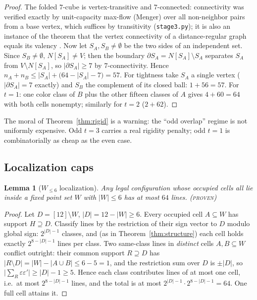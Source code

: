 \documentclass[11pt]{article}
\newtheorem{lemma}[theorem]{Lemma}
\theoremstyle{remark}
\begin{document}
\begin{proof}
The folded $7$-cube is vertex-transitive and $7$-connected: connectivity
was verified exactly by unit-capacity max-flow (Menger) over all
non-neighbor pairs from a base vertex, which suffices by transitivity
(\texttt{stage3.py}); it is also an instance of the theorem that the
vertex connectivity of a distance-regular graph equals its valency
\cite{BrouwerKoolen09}. Now let $S_A,S_B\ne\emptyset$ be the two sides of
an independent set. Since $S_B\ne\emptyset$, $N[S_A]\ne V$; then the
boundary $\partial S_A=N[S_A]\setminus S_A$ separates $S_A$ from
$V\setminus N[S_A]$, so $|\partial S_A|\ge 7$ by $7$-connectivity. Hence
$n_A+n_B\le|S_A|+\bigl(64-|S_A|-7\bigr)=57$. For tightness take $S_A$ a
single vertex ($|\partial S_A|=7$ exactly) and $S_B$ the complement of its
closed ball: $1+56=57$. For $t=1$: one color class of $B$ plus the other
fifteen classes of $A$ gives $4+60=64$ with both cells nonempty;
similarly for $t=2$ ($2+62$).
\end{proof}

The moral of Theorem~\ref{thm:rigid} is a warning: the ``odd overlap''
regime is not uniformly expensive. Odd $t=3$ carries a real rigidity
penalty; odd $t=1$ is combinatorially as cheap as the even case.

\subsection{Localization caps}

\begin{lemma}[$W_{\le6}$ localization]\label{lem:w6}
Any legal configuration whose occupied cells all lie inside a fixed point
set $W$ with $|W|\le 6$ has at most $64$ lines. \textsc{(proven)}
\end{lemma}

\begin{proof}
Let $D=[12]\setminus W$, $|D|=12-|W|\ge 6$. Every occupied cell $A\subseteq
W$ has support $H\supseteq D$. Classify lines by the restriction of their
sign vector to $D$ modulo global sign: $2^{|D|-1}$ classes, and (as in
Theorem~\ref{thm:structure}) each cell holds exactly $2^{8-|D|-1}$ lines
per class. Two same-class lines in \emph{distinct} cells $A,B\subseteq W$
conflict outright: their common support $R\supseteq D$ has
$|R\setminus D|=|W|-|A\cup B|\le 6-5=1$, and the restriction sum over $D$
is $\pm|D|$, so $\bigl|\sum_R\varepsilon\varepsilon'\bigr|\ge|D|-1\ge5$.
Hence each class contributes lines of at most one cell, i.e.\ at most
$2^{8-|D|-1}$ lines, and the total is at most
$2^{|D|-1}\cdot2^{8-|D|-1}=64$. One full cell attains it.
\end{proof}
\end{document}
